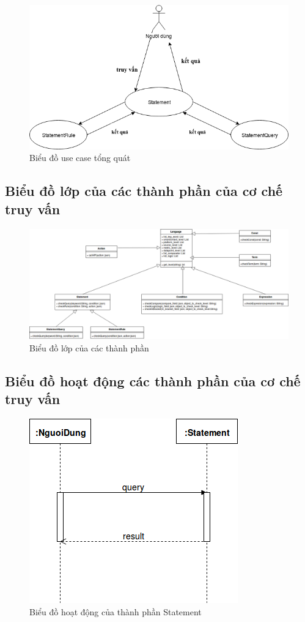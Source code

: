 \begin{figure}[h!]
	\center
	\includegraphics[scale=0.6]{image/language_diagram-use_case}
	\caption{Biểu đồ use case tổng quát}
\end{figure}


\subsection{Biểu đồ lớp của các thành phần của cơ chế truy vấn}

\begin{figure}[h!]
	\center
	\includegraphics[scale=0.35]{image/language_diagram-class_diagram}	
	\caption{Biểu đồ lớp của các thành phần}
\end{figure}


\subsection{Biểu đồ hoạt động các thành phần của cơ chế truy vấn}

\begin{figure}[h!]
	\center
	\includegraphics[scale=0.4]{image/language_diagram-statement}	
	\caption{Biểu đồ hoạt động của thành phần Statement}
\end{figure}


